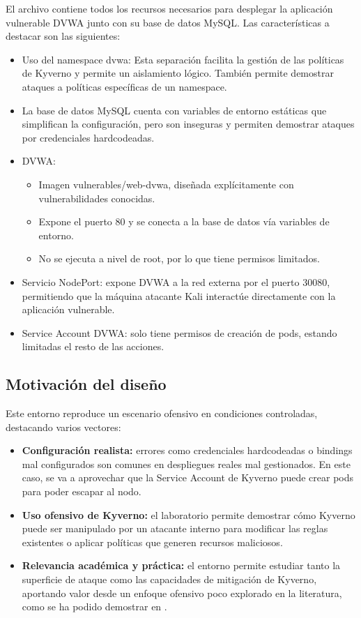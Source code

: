 \documentclass[12pt,twoside,titlepage]{report}
\begin{document}
El archivo  contiene todos los recursos necesarios para desplegar la aplicación vulnerable DVWA junto con su base de datos MySQL. Las características a destacar son las siguientes:

\begin{itemize}
    \item Uso del namespace dvwa: Esta separación facilita la gestión de las políticas de Kyverno y permite un aislamiento lógico. También permite demostrar ataques a políticas específicas de un namespace.

    \item La base de datos MySQL cuenta con variables de entorno estáticas que simplifican la configuración, pero son inseguras y permiten demostrar ataques por credenciales hardcodeadas.

    \item DVWA:
        \begin{itemize}
            \item Imagen vulnerables/web-dvwa, diseñada explícitamente con vulnerabilidades conocidas.
            \item Expone el puerto 80 y se conecta a la base de datos vía variables de entorno.
            \item No se ejecuta a nivel de root, por lo que tiene permisos limitados.
        \end{itemize}

    \item Servicio NodePort: expone DVWA a la red externa por el puerto 30080, permitiendo que la máquina atacante Kali interactúe directamente con la aplicación vulnerable.
    \item Service Account DVWA: solo tiene permisos de creación de pods, estando limitadas el resto de las acciones.


\end{itemize}

\subsection{Motivación del diseño}

Este entorno reproduce un escenario ofensivo en condiciones controladas, destacando varios vectores:
\begin{itemize}
    \item \textbf{Configuración realista:} errores como credenciales hardcodeadas o bindings mal configurados son comunes en despliegues reales mal gestionados. En este caso, se va a aprovechar que la Service Account de Kyverno puede crear pods para poder escapar al nodo.
    \item \textbf{Uso ofensivo de Kyverno:} el laboratorio permite demostrar cómo Kyverno puede ser manipulado por un atacante interno para modificar las reglas existentes o aplicar políticas que generen recursos maliciosos.
    \item \textbf{Relevancia académica y práctica:} el entorno permite estudiar tanto la superficie de ataque como las capacidades de mitigación de Kyverno, aportando valor desde un enfoque ofensivo poco explorado en la literatura, como se ha podido demostrar en .
\end{itemize}
\end{document}
